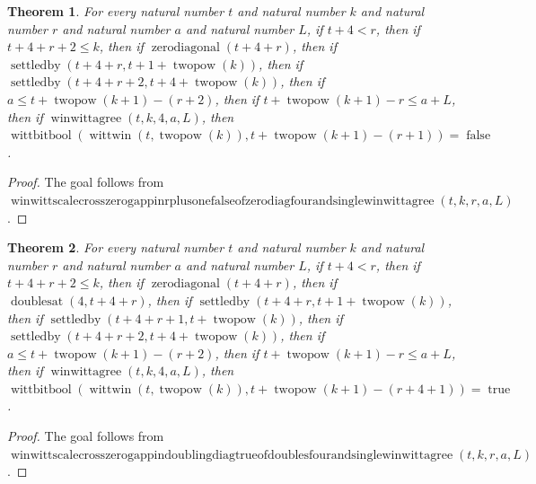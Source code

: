 \documentclass[11pt]{article}
\newtheorem{theorem}{Theorem}[section]
\theoremstyle{definition}
\begin{document}
\begin{theorem}
\label{ll:paper:winwitt-scale-cross-zero-gap-pin-r-plus-one-false-of-zero-diag-four-and-single-winwittagree}
For every natural number \(t\) and natural number \(k\) and natural number \(r\) and natural number \(a\) and natural number \(L\), if \(t + 4 < r\), then if \(t + 4 + r + 2 \le k\), then if \(\operatorname{zerodiagonal}(t + 4 + r)\), then if \(\operatorname{settledby}(t + 4 + r, t + 1 + \operatorname{twopow}(k))\), then if \(\operatorname{settledby}(t + 4 + r + 2, t + 4 + \operatorname{twopow}(k))\), then if \(a \le t + \operatorname{twopow}(k + 1) - (r + 2)\), then if \(t + \operatorname{twopow}(k + 1) - r \le a + L\), then if \(\operatorname{winwittagree}(t, k, 4, a, L)\), then \(\operatorname{wittbitbool}(\operatorname{wittwin}(t, \operatorname{twopow}(k)), t + \operatorname{twopow}(k + 1) - (r + 1)) = \operatorname{false}\).
\end{theorem}
\begin{proof}
The goal follows from \(\operatorname{winwittscalecrosszerogappinrplusonefalseofzerodiagfourandsinglewinwittagree}(t, k, r, a, L)\).
\end{proof}
\begin{theorem}
\label{ll:paper:winwitt-scale-cross-zero-gap-pin-doubling-diag-true-of-doubles-four-and-single-winwittagree}
For every natural number \(t\) and natural number \(k\) and natural number \(r\) and natural number \(a\) and natural number \(L\), if \(t + 4 < r\), then if \(t + 4 + r + 2 \le k\), then if \(\operatorname{zerodiagonal}(t + 4 + r)\), then if \(\operatorname{doublesat}(4, t + 4 + r)\), then if \(\operatorname{settledby}(t + 4 + r, t + 1 + \operatorname{twopow}(k))\), then if \(\operatorname{settledby}(t + 4 + r + 1, t + \operatorname{twopow}(k))\), then if \(\operatorname{settledby}(t + 4 + r + 2, t + 4 + \operatorname{twopow}(k))\), then if \(a \le t + \operatorname{twopow}(k + 1) - (r + 2)\), then if \(t + \operatorname{twopow}(k + 1) - r \le a + L\), then if \(\operatorname{winwittagree}(t, k, 4, a, L)\), then \(\operatorname{wittbitbool}(\operatorname{wittwin}(t, \operatorname{twopow}(k)), t + \operatorname{twopow}(k + 1) - (r + 4 + 1)) = \operatorname{true}\).
\end{theorem}
\begin{proof}
The goal follows from \(\operatorname{winwittscalecrosszerogappindoublingdiagtrueofdoublesfourandsinglewinwittagree}(t, k, r, a, L)\).
\end{proof}
\end{document}
